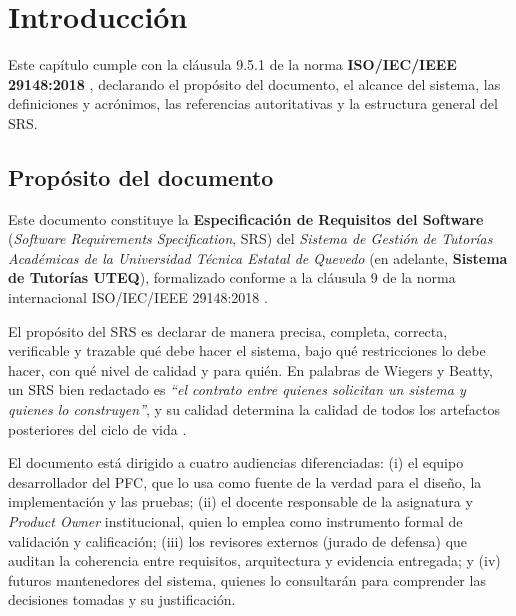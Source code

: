 \documentclass[11pt,a4paper,twoside]{report}
\begin{document}
\tableofcontents
\clearpage

\chapter{Introducci\'on}
\label{cap:introduccion}

\begin{cajaNota}[title=Prop\'osito de este cap\'itulo]
    Este cap\'itulo cumple con la cl\'ausula 9.5.1 de la norma \textbf{ISO/IEC/IEEE 29148:2018} \cite{iso29148}, declarando el prop\'osito del documento, el alcance del sistema, las definiciones y acr\'onimos, las referencias autoritativas y la estructura general del SRS.
\end{cajaNota}

\section{Prop\'osito del documento}
\label{sec:proposito}

Este documento constituye la \textbf{Especificaci\'on de Requisitos del Software} (\emph{Software Requirements Specification}, SRS) del \textit{Sistema de Gesti\'on de Tutor\'ias Acad\'emicas de la Universidad T\'ecnica Estatal de Quevedo} (en adelante, \textbf{Sistema de Tutor\'ias UTEQ}), formalizado conforme a la cl\'ausula 9 de la norma internacional ISO/IEC/IEEE 29148:2018 \cite{iso29148}.

El prop\'osito del SRS es declarar de manera precisa, completa, correcta, verificable y trazable qu\'e debe hacer el sistema, bajo qu\'e restricciones lo debe hacer, con qu\'e nivel de calidad y para qui\'en. En palabras de Wiegers y Beatty, un SRS bien redactado es \textit{``el contrato entre quienes solicitan un sistema y quienes lo construyen''}, y su calidad determina la calidad de todos los artefactos posteriores del ciclo de vida \cite{wiegers2013software}.

El documento est\'a dirigido a cuatro audiencias diferenciadas: (i) el equipo desarrollador del PFC, que lo usa como fuente de la verdad para el dise\~no, la implementaci\'on y las pruebas; (ii) el docente responsable de la asignatura y \emph{Product Owner} institucional, quien lo emplea como instrumento formal de validaci\'on y calificaci\'on; (iii) los revisores externos (jurado de defensa) que auditan la coherencia entre requisitos, arquitectura y evidencia entregada; y (iv) futuros mantenedores del sistema, quienes lo consultar\'an para comprender las decisiones tomadas y su justificaci\'on.
\end{document}
